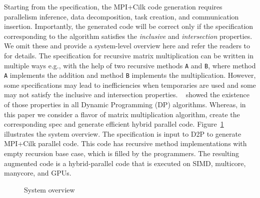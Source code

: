 Starting from the specification, the MPI+Cilk code generation requires  parallelism inference, data decomposition, task creation, and communication insertion. Importantly, the generated code will be correct only if the specification corresponding to the algorithm satisfies the {\em inclusive} and {\em intersection} properties. We omit these and provide a system-level overview here and refer the readers to~\cite{hegde2019d2p} for details. The specification for recursive matrix multiplication can be written in multiple ways e.g., with the help of two recursive methods \texttt{A} and \texttt{B}, where method \texttt{A} implements the addition and method \texttt{B} implements the multiplication. However, some specifications may lead to inefficiencies when temporaries are used and some may not satisfy the inclusive and intersection properties. ~\cite{hegde2019d2p} showed the existence of those properties in all Dynamic Programming (DP) algorithms. Whereas, in this paper we consider a flavor of matrix multiplication algorithm, create the corresponding spec and generate efficient hybrid parallel code. Figure~\ref{fig:workflow} illustrates the system overview. The specification is input to D2P to generate 
 MPI+Cilk parallel code. This code has recursive method implementations with empty recursion base case, which is filled by the programmers. The resulting augmented code is a hybrid-parallel code that is executed on SIMD, multicore, manycore, and GPUs.  %
\begin{figure}[h]
    \centering
    
    \caption{System overview}
    \label{fig:workflow}
\end{figure}
 
